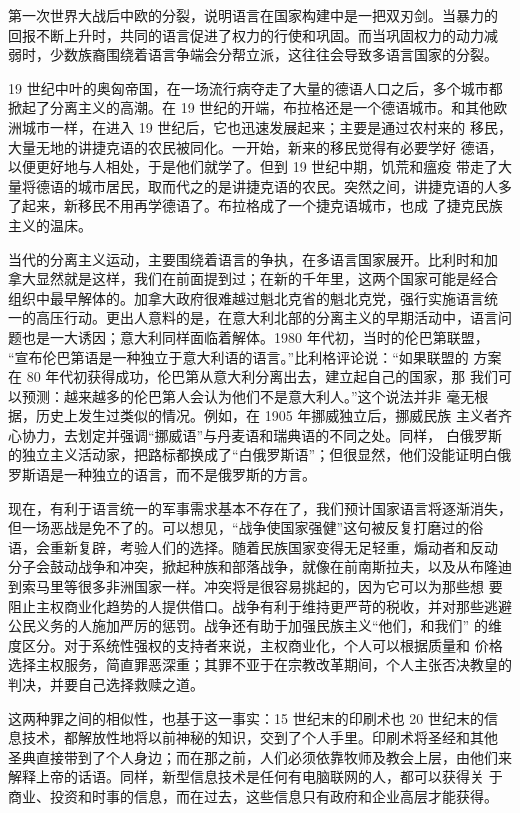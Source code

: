 第一次世界大战后中欧的分裂，说明语言在国家构建中是一把双刃剑。当暴力的 回报不断上升时，共同的语言促进了权力的行使和巩固。而当巩固权力的动力减 弱时，少数族裔围绕着语言争端会分帮立派，这往往会导致多语言国家的分裂。

19 世纪中叶的奥匈帝国，在一场流行病夺走了大量的德语人口之后，多个城市都掀起了分离主义的高潮。在 19 世纪的开端，布拉格还是一个德语城市。和其他欧洲城市一样，在进入 19 世纪后，它也迅速发展起来；主要是通过农村来的 移民，大量无地的讲捷克语的农民被同化。一开始，新来的移民觉得有必要学好 德语，以便更好地与人相处，于是他们就学了。但到 19 世纪中期，饥荒和瘟疫 带走了大量将德语的城市居民，取而代之的是讲捷克语的农民。突然之间，讲捷克语的人多了起来，新移民不用再学德语了。布拉格成了一个捷克语城市，也成 了捷克民族主义的温床。

当代的分离主义运动，主要围绕着语言的争执，在多语言国家展开。比利时和加 拿大显然就是这样，我们在前面提到过；在新的千年里，这两个国家可能是经合 组织中最早解体的。加拿大政府很难越过魁北克省的魁北克党，强行实施语言统 一的高压行动。更出人意料的是，在意大利北部的分离主义的早期活动中，语言问题也是一大诱因；意大利同样面临着解体。1980 年代初，当时的伦巴第联盟， “宣布伦巴第语是一种独立于意大利语的语言。”比利格评论说：“如果联盟的 方案在 80 年代初获得成功，伦巴第从意大利分离出去，建立起自己的国家，那 我们可以预测：越来越多的伦巴第人会认为他们不是意大利人。”这个说法并非 毫无根据，历史上发生过类似的情况。例如，在 1905 年挪威独立后，挪威民族 主义者齐心协力，去划定并强调“挪威语”与丹麦语和瑞典语的不同之处。同样， 白俄罗斯的独立主义活动家，把路标都换成了“白俄罗斯语”；但很显然，他们没能证明白俄罗斯语是一种独立的语言，而不是俄罗斯的方言。

现在，有利于语言统一的军事需求基本不存在了，我们预计国家语言将逐渐消失， 但一场恶战是免不了的。可以想见，“战争使国家强健”这句被反复打磨过的俗 语，会重新复辟，考验人们的选择。随着民族国家变得无足轻重，煽动者和反动 分子会鼓动战争和冲突，掀起种族和部落战争，就像在前南斯拉夫，以及从布隆迪到索马里等很多非洲国家一样。冲突将是很容易挑起的，因为它可以为那些想 要阻止主权商业化趋势的人提供借口。战争有利于维持更严苛的税收，并对那些逃避公民义务的人施加严厉的惩罚。战争还有助于加强民族主义“他们，和我们” 的维度区分。对于系统性强权的支持者来说，主权商业化，个人可以根据质量和 价格选择主权服务，简直罪恶深重；其罪不亚于在宗教改革期间，个人主张否决教皇的判决，并要自己选择救赎之道。

这两种罪之间的相似性，也基于这一事实：15 世纪末的印刷术也 20 世纪末的信 息技术，都解放性地将以前神秘的知识，交到了个人手里。印刷术将圣经和其他 圣典直接带到了个人身边；而在那之前，人们必须依靠牧师及教会上层，由他们来解释上帝的话语。同样，新型信息技术是任何有电脑联网的人，都可以获得关 于商业、投资和时事的信息，而在过去，这些信息只有政府和企业高层才能获得。



